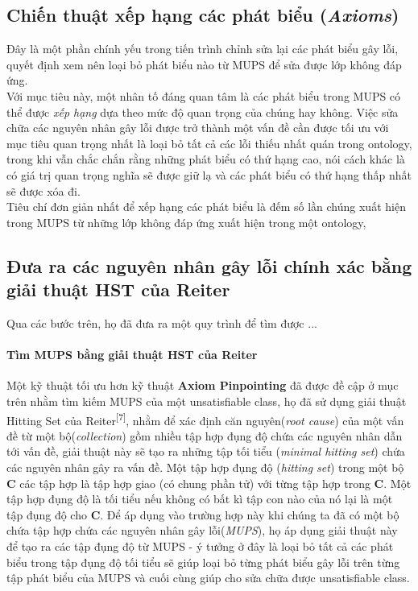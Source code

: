 \subsection{Chiến thuật xếp hạng các phát biểu (\textit{Axioms})}
Đây là một phần chính yếu trong tiến trình chỉnh sửa lại các phát biểu gây lỗi, quyết định xem nên loại bỏ phát biểu nào từ MUPS để sửa được lớp không đáp ứng.
\\
\hspace{.05\textwidth} Với mục tiêu này, một nhân tố đáng quan tâm là các phát biểu trong MUPS có thể được \textit{xếp hạng} dựa theo mức độ quan trọng của chúng hay không. Việc sửa chữa các nguyên nhân gây lỗi được trở thành một vấn đề cần được tối ưu với mục tiêu quan trọng nhất là loại bỏ tất cả các lỗi thiếu nhất quán trong ontology, trong khi vẫn chắc chắn rằng những phát biểu có thứ hạng cao, nói cách khác là có giá trị quan trọng nghĩa sẽ được giữ lạ và các phát biểu có thứ hạng thấp nhất sẽ được xóa đi.
\\
\hspace{.05\textwidth} Tiêu chí đơn giản nhất để xếp hạng các phát biểu là đếm số lần chúng xuất hiện trong MUPS từ những lớp không đáp ứng xuất hiện trong một ontology,
\subsection{Đưa ra các nguyên nhân gây lỗi chính xác bằng giải thuật HST của Reiter}
Qua các bước trên, họ đã đưa ra một quy trình để tìm được ...

\paragraph{Tìm MUPS bằng giải thuật HST của Reiter}
Một kỹ thuật tối ưu hơn kỹ thuật \textbf{Axiom Pinpointing} đã được đề cập ở mục trên nhằm tìm kiếm MUPS của một unsatisfiable class, họ đã sử dụng giải thuật Hitting Set của Reiter\textsuperscript{[7]}, nhằm để xác định căn nguyên(\textit{root cause}) của một vấn đề từ một bộ(\textit{collection}) gồm nhiều tập hợp đụng độ chứa các nguyên nhân dẫn tới vấn đề, giải thuật này sẽ tạo ra những tập tối tiểu (\textit{minimal hitting set}) chứa các nguyên nhân gây ra vấn đề. Một tập hợp đụng độ (\textit{hitting set}) trong một bộ \textbf{C} các tập hợp là tập hợp giao (có chung phần tử) với từng tập hợp trong \textbf{C}. Một tập hợp đụng độ là tối tiểu nếu không có bất kì tập con nào của nó lại là một tập đụng độ cho \textbf{C}. Để áp dụng vào trường hợp này khi chúng ta đã có một bộ chứa tập hợp chứa các nguyên nhân gây lỗi(\textit{MUPS}), họ áp dụng giải thuật này để tạo ra các tập đụng độ từ MUPS - ý tưởng ở đây là loại bỏ tất cả các phát biểu trong tập đụng độ tối tiểu sẽ giúp loại bỏ từng phát biểu gây lỗi trên từng tập phát biểu của MUPS và cuối cùng giúp cho sửa chữa được unsatisfiable class.		
